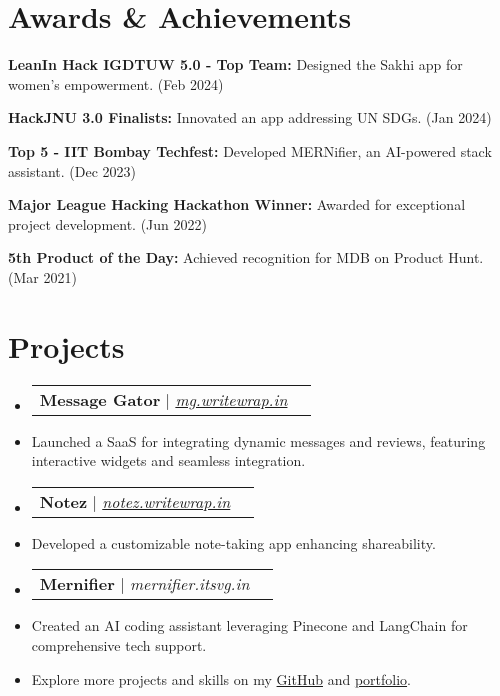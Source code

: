 \documentclass[letterpaper,11pt]{article}
\makeatletter
\newcommand{\resumeItem}[1]{
  \item\small{
    {#1 \vspace{-2pt}}
  }
}
\newcommand{\resumeProjectHeading}[2]{
    \vspace{-2pt}\item
    \begin{tabular*}{0.97\textwidth}{l@{\extracolsep{\fill}}r}
      \small#1 & #2 \\
    \end{tabular*}\vspace{-7pt}
}
\newcommand{\resumeSubHeadingListStart}{\begin{itemize}[leftmargin=0.15in, label={}]}
\newcommand{\resumeSubHeadingListEnd}{\end{itemize}}
\makeatother
\begin{document}
\section{Awards \& Achievements}
  \vspace{2pt}
  \resumeSubHeadingListStart
  \small{
    \item{
    
    \textbf{LeanIn Hack IGDTUW 5.0 - Top Team:}{ Designed the Sakhi app for women's empowerment. (Feb 2024)}
    
    \textbf{HackJNU 3.0 Finalists:}{ Innovated an app addressing UN SDGs. (Jan 2024)}
    
    \textbf{Top 5 - IIT Bombay Techfest:}{ Developed MERNifier, an AI-powered stack assistant. (Dec 2023)}
    
    \textbf{Major League Hacking Hackathon Winner:}{ Awarded for exceptional project development. (Jun 2022)}
    
    \textbf{5th Product of the Day:}{ Achieved recognition for MDB on Product Hunt. (Mar 2021)}

    }}
  \resumeSubHeadingListEnd

\section{Projects}
\resumeSubHeadingListStart

\resumeProjectHeading{\textbf{Message Gator} | \emph{\href{http://mg.writewrap.in}{mg.writewrap.in}}}{}
\resumeItem{Launched a SaaS for integrating dynamic messages and reviews, featuring interactive widgets and seamless integration.}

\resumeProjectHeading{\textbf{Notez} | \emph{\href{http://notez.writewrap.in}{notez.writewrap.in}}}{}
\resumeItem{Developed a customizable note-taking app enhancing shareability.}

\resumeProjectHeading{\textbf{Mernifier} | \emph{mernifier.itsvg.in}}{}
\resumeItem{Created an AI coding assistant leveraging Pinecone and LangChain for comprehensive tech support.}

\resumeItem{Explore more projects and skills on my \href{http://github.com/pushkarydv}{GitHub} and \href{https://pushkaryadav.in}{portfolio}.}

\resumeSubHeadingListEnd

\end{document}
